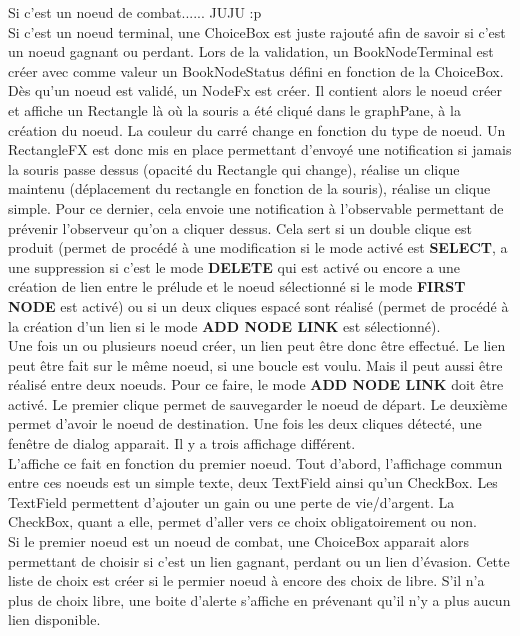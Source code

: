 			Si c'est un noeud de combat...... JUJU  :p\\


			Si c'est un noeud terminal, une ChoiceBox est juste rajouté afin de savoir si c'est un noeud gagnant ou perdant. Lors de la validation, un BookNodeTerminal est créer avec comme valeur un BookNodeStatus défini en fonction de la ChoiceBox.\\

			Dès qu'un noeud est validé, un NodeFx est créer. Il contient alors le noeud créer et affiche un Rectangle là où la souris a été cliqué dans le graphPane, à la création du noeud. La couleur du carré change en fonction du type de noeud. Un RectangleFX est donc mis en place permettant d'envoyé une notification si jamais la souris passe dessus (opacité du Rectangle qui change), réalise un clique maintenu (déplacement du rectangle en fonction de la souris), réalise un clique simple. Pour ce dernier, cela envoie une notification à l'observable permettant de prévenir l'observeur qu'on a cliquer dessus. Cela sert si un double clique est produit (permet de procédé à une modification si le mode activé est \textbf{SELECT}, a une suppression si c'est le mode \textbf{DELETE} qui est activé ou encore a une création de lien entre le prélude et le noeud sélectionné si le mode \textbf{FIRST NODE} est activé) ou si un deux cliques espacé sont réalisé (permet de procédé à la création d'un lien si le mode \textbf{ADD NODE LINK} est sélectionné).\\

			Une fois un ou plusieurs noeud créer, un lien peut être donc être effectué. Le lien peut être fait sur le même noeud, si une boucle est voulu. Mais il peut aussi être réalisé entre deux noeuds. Pour ce faire, le mode \textbf{ADD NODE LINK} doit être activé. Le premier clique permet de sauvegarder le noeud de départ. Le deuxième permet d'avoir le noeud de destination. Une fois les deux cliques détecté, une fenêtre de dialog apparait. Il y a trois affichage différent.\\
			L'affiche ce fait en fonction du premier noeud. Tout d'abord, l'affichage commun entre ces noeuds est un simple texte, deux TextField ainsi qu'un CheckBox. Les TextField permettent d'ajouter un gain ou une perte de vie/d'argent. La CheckBox, quant a elle, permet d'aller vers ce choix obligatoirement ou non.\\
			Si le premier noeud est un noeud de combat, une ChoiceBox apparait alors permettant de choisir si c'est un lien gagnant, perdant ou un lien d'évasion. Cette liste de choix est créer si le permier noeud à encore des choix de libre. S'il n'a plus de choix libre, une boite d'alerte s'affiche en prévenant qu'il n'y a plus aucun lien disponible.\\

